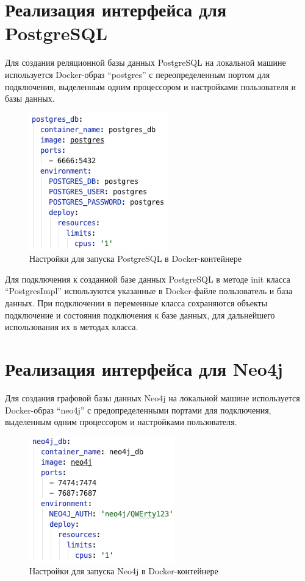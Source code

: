 \section{Реализация интерфейса для PostgreSQL}

Для создания реляционной базы данных PostgreSQL на локальной машине используется Docker-образ “postgres” с переопределенным портом для
подключения, выделенным одним процессором и настройками пользователя и базы данных.

\begin{figure}[ht!]
    \center
    \includegraphics [scale=0.7] {my_folder/myimg//4}
    \caption{Настройки для запуска PostgreSQL в Docker-контейнере}
\end{figure}

Для подключения к созданной базе данных PostgreSQL в методе init класса “PostgresImpl” используются указанные в Docker-файле пользователь и
база данных. При подключении в переменные класса сохраняются объекты подключение и состояния подключения к базе данных, для дальнейшего
использования их в методах класса.


\section{Реализация интерфейса для Neo4j}

Для создания графовой базы данных Neo4j на локальной машине используется Docker-образ “neo4j” с предопределенными портами для подключения,
выделенным одним процессором и настройками пользователя.

\begin{figure}[ht!]
    \center
    \includegraphics [scale=0.7] {my_folder/myimg//5}
    \caption{Настройки для запуска Neo4j в Docker-контейнере}
\end{figure}

